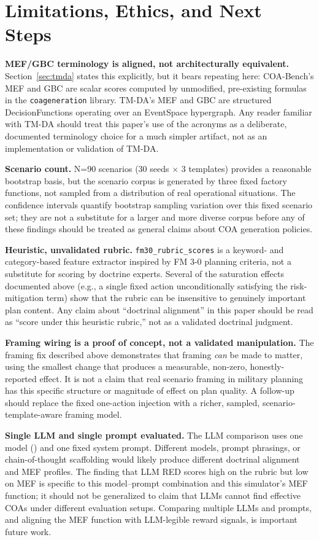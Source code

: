 \documentclass[sigconf]{acmart}
\begin{document}
\section{Limitations, Ethics, and Next Steps}
\label{sec:limitations}

\textbf{MEF/GBC terminology is aligned, not architecturally equivalent.} Section~\ref{sec:tmda} states this explicitly, but it bears repeating here: COA-Bench's MEF and GBC are scalar scores computed by unmodified, pre-existing formulas in the \texttt{coageneration} library. TM-DA's MEF and GBC are structured DecisionFunctions operating over an EventSpace hypergraph. Any reader familiar with TM-DA should treat this paper's use of the acronyms as a deliberate, documented terminology choice for a much simpler artifact, not as an implementation or validation of TM-DA.

\textbf{Scenario count.} N=90 scenarios (30 seeds $\times$ 3 templates) provides a reasonable bootstrap basis, but the scenario corpus is generated by three fixed factory functions, not sampled from a distribution of real operational situations. The confidence intervals quantify bootstrap sampling variation over this fixed scenario set; they are not a substitute for a larger and more diverse corpus before any of these findings should be treated as general claims about COA generation policies.

\textbf{Heuristic, unvalidated rubric.} \texttt{fm30\_rubric\_scores} is a keyword- and category-based feature extractor inspired by FM 3-0 planning criteria, not a substitute for scoring by doctrine experts. Several of the saturation effects documented above (e.g., a single fixed action unconditionally satisfying the risk-mitigation term) show that the rubric can be insensitive to genuinely important plan content. Any claim about ``doctrinal alignment'' in this paper should be read as ``score under this heuristic rubric,'' not as a validated doctrinal judgment.

\textbf{Framing wiring is a proof of concept, not a validated manipulation.} The framing fix described above demonstrates that framing \emph{can} be made to matter, using the smallest change that produces a measurable, non-zero, honestly-reported effect. It is not a claim that real scenario framing in military planning has this specific structure or magnitude of effect on plan quality. A follow-up should replace the fixed one-action injection with a richer, sampled, scenario-template-aware framing model.

\textbf{Single LLM and single prompt evaluated.} The LLM comparison uses one model () and one fixed system prompt. Different models, prompt phrasings, or chain-of-thought scaffolding would likely produce different doctrinal alignment and MEF profiles. The finding that LLM RED scores high on the rubric but low on MEF is specific to this model--prompt combination and this simulator's MEF function; it should not be generalized to claim that LLMs cannot find effective COAs under different evaluation setups. Comparing multiple LLMs and prompts, and aligning the MEF function with LLM-legible reward signals, is important future work.
\end{document}

